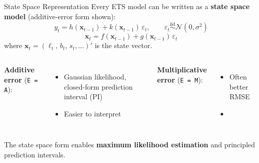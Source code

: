 \documentclass[aspectratio=169, 11pt]{beamer}
\begin{document}
\begin{frame}{State Space Representation}
  Every ETS model can be written as a \textbf{state space model} (additive-error form shown):
  \[
    y_t = h(\mathbf{x}_{t-1}) + k(\mathbf{x}_{t-1})\,\varepsilon_t,
    \qquad \varepsilon_t \overset{\mathrm{iid}}{\sim} \mathcal{N}(0,\sigma^2)
  \]
  \[
    \mathbf{x}_t = f(\mathbf{x}_{t-1}) + g(\mathbf{x}_{t-1})\,\varepsilon_t
  \]
  where $\mathbf{x}_t = (\ell_t,\, b_t,\, s_t, \ldots)'$ is the state vector.

  \vspace{0.1cm}
  \begin{columns}[T]
      \textbf{Additive error} (\texttt{E = A}):
      \begin{itemize}\small
        \item Gaussian likelihood, closed-form
              prediction interval (PI)
        \item Easier to interpret
      \end{itemize}
      \textbf{Multiplicative error} (\texttt{E = M}):
      \begin{itemize}\small
        \item Often better RMSE
        \item {}
      \end{itemize}
  \end{columns}
  \begin{keybox}
    The state space form enables \textbf{maximum likelihood estimation}
    and principled prediction intervals.
  \end{keybox}
\end{frame}
\end{document}
